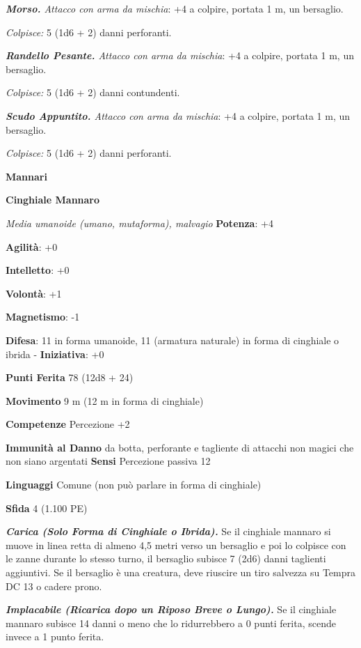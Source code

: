 \begin{multicols}{2}
\emph{\textbf{Morso.} Attacco con arma da mischia}: +4 a colpire,
portata 1 m, un bersaglio.

\emph{Colpisce:} 5 (1d6 + 2) danni perforanti.

\emph{\textbf{Randello Pesante.} Attacco con arma da mischia}: +4 a
colpire, portata 1 m, un bersaglio.

\emph{Colpisce:} 5 (1d6 + 2) danni contundenti.

\emph{\textbf{Scudo Appuntito.} Attacco con arma da mischia}: +4 a
colpire, portata 1 m, un bersaglio.

\emph{Colpisce:} 5 (1d6 + 2) danni perforanti.



\textbf{Mannari}

\textbf{Cinghiale Mannaro}

\emph{Media umanoide (umano, mutaforma), malvagio}
\textbf{Potenza}: +4

\textbf{Agilità}: +0

\textbf{Intelletto}: +0

\textbf{Volontà}: +1

\textbf{Magnetismo}: -1

\textbf{Difesa}: 11 in forma umanoide, 11 (armatura naturale) in
forma di cinghiale o ibrida  - \textbf{Iniziativa}: +0

\textbf{Punti Ferita} 78 (12d8 + 24)

\textbf{Movimento} 9 m (12 m in forma di cinghiale)

\textbf{Competenze} Percezione +2

\textbf{Immunità al Danno} da botta, perforante e tagliente di
attacchi non magici che non siano argentati \textbf{Sensi} Percezione
passiva 12

\textbf{Linguaggi} Comune (non può parlare in forma di cinghiale)

\textbf{Sfida} 4 (1.100 PE)\smallskip

\emph{\textbf{Carica (Solo Forma di Cinghiale o Ibrida).}} Se il
cinghiale mannaro si muove in linea retta di almeno 4,5 metri verso un
bersaglio e poi lo colpisce con le zanne durante lo stesso turno, il
bersaglio subisce 7 (2d6) danni taglienti aggiuntivi. Se il bersaglio è
una creatura, deve riuscire un tiro salvezza su Tempra DC 13 o cadere
prono.

\emph{\textbf{Implacabile (Ricarica dopo un Riposo Breve o Lungo).}} Se
il cinghiale mannaro subisce 14 danni o meno che lo ridurrebbero a 0
punti ferita, scende invece a 1 punto ferita.


\end{multicols}

